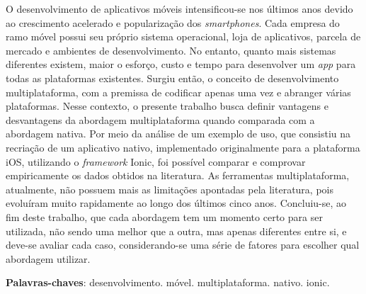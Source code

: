 \begin{resumo}

 O desenvolvimento de aplicativos móveis intensificou-se nos últimos anos devido ao crescimento acelerado e popularização dos \textit{smartphones}. Cada empresa
 do ramo móvel possui seu próprio sistema operacional, loja de aplicativos, parcela de mercado e ambientes de desenvolvimento. No entanto, quanto mais 
 sistemas diferentes existem, maior o esforço, custo e tempo para desenvolver um \textit{app} para todas as plataformas existentes. Surgiu então, o conceito de desenvolvimento multiplataforma,
 com a premissa de codificar apenas uma vez e abranger várias plataformas. Nesse contexto, o presente trabalho busca definir vantagens e desvantagens da abordagem
 multiplataforma quando comparada com a abordagem nativa. Por meio da análise de um exemplo de uso, que consistiu na recriação de um aplicativo nativo, implementado originalmente para a plataforma iOS,
 utilizando o \textit{framework} Ionic, foi possível comparar e comprovar empiricamente os dados obtidos na literatura. As ferramentas multiplataforma, atualmente,
 não possuem mais as limitações apontadas pela literatura, pois evoluíram muito rapidamente ao longo dos últimos cinco anos. Concluiu-se, ao fim deste trabalho, que cada abordagem tem um momento certo
 para ser utilizada, não sendo uma melhor que a outra, mas apenas diferentes entre si, e deve-se avaliar cada caso, considerando-se uma série de fatores para escolher qual abordagem utilizar.

 \vspace{\onelineskip}
    
 \noindent
 \textbf{Palavras-chaves}: desenvolvimento. móvel. multiplataforma. nativo. ionic. 
\end{resumo}
